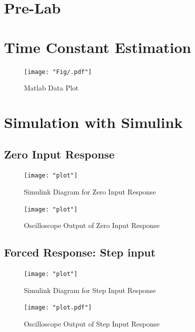 \documentclass[12pt]{article}
\begin{document}
	\section{Pre-Lab}
		
	
	\section{Time Constant Estimation}
			
		\begin{figure}[H]
			\centering
			\texttt{[image: "Fig/.pdf"]}
			\caption{Matlab Data Plot}
			\label{fig:}
		\end{figure}
		
	\section{Simulation with Simulink}
		\subsection{Zero Input Response}
			\begin{figure}[H]
				\centering
				\texttt{[image: "plot"]} %
				\caption{Simulink Diagram for Zero Input Response}
				\label{fig:slx_zero_input_diagram}
			\end{figure}	
			\begin{figure}[H]
				\centering
				\texttt{[image: "plot"]} 
				\caption{Oscilloscope Output of Zero Input Response}
				\label{fig:slx_zero_input_output}
			\end{figure}
			
		\subsection{Forced Response: Step input}
			\begin{figure}[H]
				\centering
				\texttt{[image: "plot"]} %
				\caption{Simulink Diagram for Step Input Response}
				\label{fig:slx_step_input_diagram}
			\end{figure}	
			\begin{figure}[H]
				\centering
				\texttt{[image: "plot.pdf"]} 
				\caption{Oscilloscope Output of Step Input Response}
				\label{fig:slx_step_input_output}
			\end{figure}
			
\end{document}
